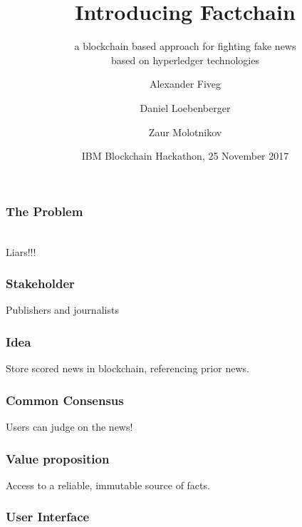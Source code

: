 \documentclass[aspectratio=169]{beamer}
\title{Introducing Factchain}
\subtitle{a blockchain based approach for fighting fake news\\based on hyperledger technologies}
\author{Alexander Fiveg \and Daniel Loebenberger \and Zaur Molotnikov}
\institute{\texttt{\{afiveg,dloeb,zmolo\}@genua.de}}
\date{IBM Blockchain Hackathon, 25 November 2017}
\begin{document}
\frame[plain]{\titlepage}

\begin{frame}
\frametitle{The Problem}

\begin{center}
\\
Liars!!!
\end{center}
\end{frame}

\begin{frame}
\frametitle{Stakeholder}

\begin{center}

Publishers and journalists
\end{center}
\end{frame}

\begin{frame}
\frametitle{Idea}

\begin{center}

Store scored news in blockchain, referencing prior news.
\end{center}
\end{frame}

\begin{frame}
\frametitle{Common Consensus}

\begin{center}

Users can judge on the news!
\end{center}
\end{frame}

\begin{frame}
\frametitle{Value proposition}

\begin{center}

Access to a reliable, immutable source of facts.
\end{center}
\end{frame}

\begin{frame}
\frametitle{User Interface}

\begin{center}
\end{center}

\end{frame}
\end{document}
